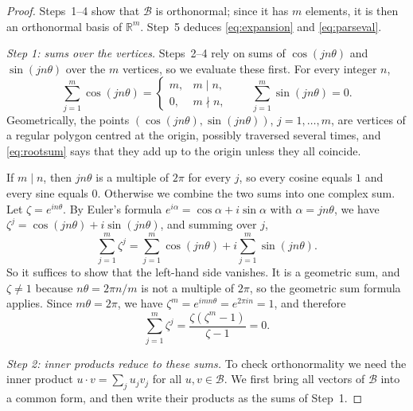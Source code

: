 \begin{proof}
  Steps~1--4 show that $\mathcal{B}$ is orthonormal; since it has $m$
  elements, it is then an orthonormal basis of $\mathbb{R}^{m}$. Step~5
  deduces \eqref{eq:expansion} and \eqref{eq:parseval}.

  \emph{Step 1: sums over the vertices.} Steps~2--4 rely on sums of
  $\cos(jn\theta)$ and $\sin(jn\theta)$ over the $m$ vertices, so we
  evaluate these first. For every integer $n$,
  \begin{equation}
    \label{eq:rootsum}
    \sum_{j=1}^{m} \cos(jn\theta) =
      \begin{cases} m, & m \mid n,\\ 0, & m \nmid n, \end{cases}
    \qquad
    \sum_{j=1}^{m} \sin(jn\theta) = 0.
  \end{equation}
  Geometrically, the points $(\cos(jn\theta), \sin(jn\theta))$,
  $j = 1, \ldots, m$, are vertices of a regular polygon centred at the
  origin, possibly traversed several times, and \eqref{eq:rootsum} says
  that they add up to the origin unless they all coincide.

  If $m \mid n$, then $jn\theta$ is a multiple of $2\pi$ for every $j$, so
  every cosine equals $1$ and every sine equals $0$. Otherwise we combine
  the two sums into one complex sum. Let $\zeta = e^{in\theta}$. By
  Euler's formula $e^{i\alpha} = \cos\alpha + i\sin\alpha$ with
  $\alpha = jn\theta$, we have $\zeta^{j} = \cos(jn\theta) + i\sin(jn\theta)$,
  and summing over $j$,
  \[
    \sum_{j=1}^{m} \zeta^{j}
      = \sum_{j=1}^{m} \cos(jn\theta) + i \sum_{j=1}^{m} \sin(jn\theta).
  \]
  So it suffices to show that the left-hand side vanishes. It is a
  geometric sum, and $\zeta \neq 1$ because $n\theta = 2\pi n/m$ is not a
  multiple of $2\pi$, so the geometric sum formula applies. Since
  $m\theta = 2\pi$, we have $\zeta^{m} = e^{imn\theta} = e^{2\pi i n} = 1$,
  and therefore
  \[
    \sum_{j=1}^{m} \zeta^{j} = \frac{\zeta(\zeta^{m} - 1)}{\zeta - 1} = 0.
  \]

  \emph{Step 2: inner products reduce to these sums.} To check
  orthonormality we need the inner product $u \cdot v = \sum_{j} u_{j}
  v_{j}$ for all $u, v \in \mathcal{B}$. We first bring all vectors of
  $\mathcal{B}$ into a common form, and then write their products as the
  sums of Step~1.


\end{proof}
